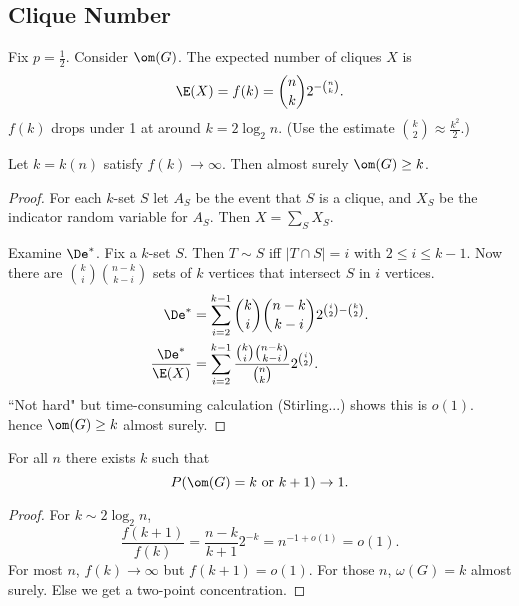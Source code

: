 \subsection{Clique Number}
Fix $p=\frac 12$. Consider $\om(G)$. The expected number of cliques $X$ is
\[
\E(X)=f(k)=\binom nk 2^{-\binom nk}.
\]
$f(k)$ drops under 1 at around $k=2\log_2 n$. (Use the estimate $\binom k2\approx \frac{k^2}{2}$.)
\begin{thm}
Let $k=k(n)$ satisfy $f(k)\to \infty$. Then almost surely $\om(G)\geq k$. 
\end{thm}
\begin{proof}
For each $k$-set $S$ let $A_S$ be the event that $S$ is a clique, and $X_S$ be the indicator random variable for $A_S$. Then $X=\sum_S X_S$. 


Examine $\De^*$. Fix a $k$-set $S$. Then $T\sim S$ iff $|T\cap S|=i$ with $2\leq i\leq k-1$. Now there are $\binom ki\binom{n-k}{k-i}$ sets of $k$ vertices that intersect $S$ in $i$ vertices.
\begin{align*}
\De^*&=\sum_{i=2}^{k-1} \binom ki\binom{n-k}{k-i}2^{\binom i2-\binom k2}.\\
\frac{\De^*}{\E(X)}&=\sum_{i=2}^{k-1} \frac{\binom ki\binom {n-k}{k-i}}{\binom nk}2^{\binom i2}.
\end{align*}
``Not hard" but time-consuming calculation (Stirling...) shows this is $o(1)$. hence $\om(G)\geq k$ almost surely.
\end{proof}

\begin{thm}
For all $n$ there exists $k$ such that 
\[
P(\om(G)=k\text{ or }k+1)\to 1.
\]
\end{thm}
\begin{proof}
For $k\sim 2\log_2 n$, 
\[
\frac{f(k+1)}{f(k)}=\frac{n-k}{k+1}2^{-k}=n^{-1+o(1)}=o(1).
\]
For most $n$, $f(k)\to \infty$ but $f(k+1)=o(1)$. 
For those $n$, $\omega(G)=k$ almost surely.
Else we get a two-point concentration.
\end{proof}